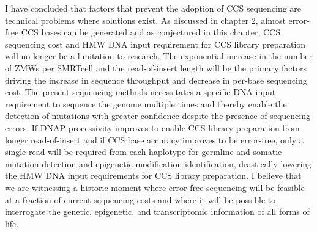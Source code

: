 I have concluded that factors that prevent the adoption of CCS sequencing are technical problems where solutions exist. As discussed in chapter 2, almost error-free CCS bases can be generated and as conjectured in this chapter, CCS sequencing cost and HMW DNA input requirement for CCS library preparation will no longer be a limitation to research. The exponential increase in the number of ZMWs per SMRTcell and the read-of-insert length will be the primary factors driving the increase in sequence throughput and decrease in per-base sequencing cost. The present sequencing methods necessitates a specific DNA input requirement to sequence the genome multiple times and thereby enable the detection of mutations with greater confidence despite the presence of sequencing errors. If DNAP processivity improves to enable CCS library preparation from longer read-of-insert and if CCS base accuracy improves to be error-free, only a single read will be required from each haplotype for germline and somatic mutation detection and epigenetic modification identification, drastically lowering the HMW DNA input requirements for CCS library preparation. I believe that we are witnessing a historic moment where error-free sequencing will be feasible at a fraction of current sequencing costs and where it will be possible to interrogate the genetic, epigenetic, and transcriptomic information of all forms of life.  










